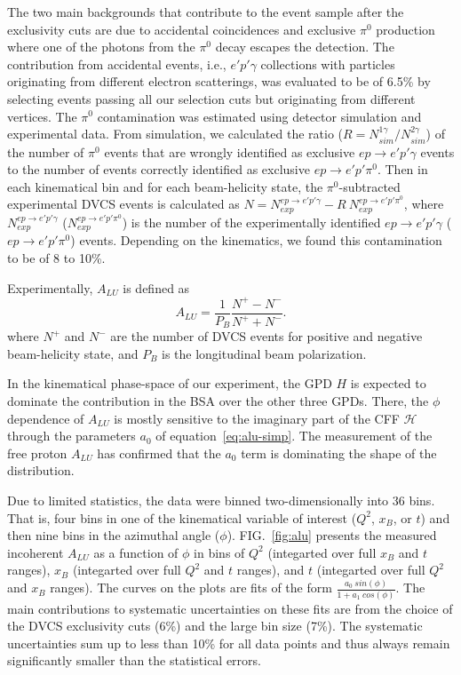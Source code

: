 \documentclass[twocolumn,nofootinbib,showpacs,prl,superscriptaddress,secnumarabic,amssymb,nobibnotes,aps,floatfix]{revtex4}
\begin{document}
The two main backgrounds that contribute to the event sample after the exclusivity cuts are  
due to accidental coincidences and exclusive $\pi^0$ production where one of the photons 
from the $\pi^0$ decay escapes the detection. The contribution from accidental 
events, i.e., $e'p'\gamma$ collections 
with particles originating from different electron scatterings,
was evaluated to be of 6.5\% by selecting events passing all our selection cuts but originating from 
different vertices. The $\pi^0$ contamination was estimated using detector 
simulation and experimental data. From simulation, we calculated the ratio ($R 
= N^{1\gamma}_{sim}/N^{2\gamma}_{sim}$) of the number of $\pi^0$ events that 
are wrongly identified as exclusive $ep\rightarrow e'p'\gamma$ events to the 
number of events correctly identified as exclusive $ep\rightarrow e'p'\pi^0$.  
Then in each kinematical bin and for each beam-helicity state, the 
$\pi^0$-subtracted experimental DVCS events is calculated as $N = 
N^{ep\rightarrow e'p'\gamma}_{exp}- R~N^{ep\rightarrow e'p'\pi^0}_{exp}$, where 
$N^{ep\rightarrow e'p'\gamma}_{exp}$ ($N^{ep\rightarrow e'p'\pi^0}_{exp}$) is 
the number of the experimentally identified $ep\rightarrow e'p'\gamma$ 
($ep\rightarrow e'p'\pi^0$) events. Depending on the kinematics, we found this 
contamination to be of 8 to 10\%. 


Experimentally, $A_{LU}$ is defined as
\begin{equation}
A_{LU} = \frac{1}{P_{B}} \frac{N^{+} - N^{-}}{N^{+} + N^{-} }.
\end{equation}
where $N^{+}$ and $N^{-}$ are the number of DVCS events for positive and negative 
beam-helicity state, and $P_{B}$ is the longitudinal beam polarization.  

In the kinematical phase-space of our experiment, the GPD $H$ is
expected to dominate the 
contribution in the BSA over the other three GPDs. There, 
the $\phi$ dependence of $A_{LU}$ is mostly sensitive to the  
imaginary part of the CFF $\mathcal{H}$ through the parameters $a_0$ of 
equation~\ref{eq:alu-simp}. The measurement of the free proton 
$A_{LU}$ \cite{Girod:2007aa} has confirmed that the $a_0$ term is 
dominating the shape of the distribution. 

Due to limited statistics, the data were binned two-dimensionally into 36 bins.  
That is, four bins in one of the kinematical variable of interest ($Q^{2}$, 
$x_{B}$, or $t$) and then nine bins in the azimuthal angle ($\phi$).   
FIG.~\ref{fig:alu} presents the measured incoherent $A_{LU}$ as a function of 
$\phi$ in bins of $Q^{2}$ (integarted over full $x_{B}$ and $t$ ranges), 
$x_{B}$ (integarted over full $Q^{2}$ and $t$ ranges), and $t$ (integarted over 
full $Q^{2}$ and $x_{B}$ ranges). The curves on the plots are fits of the form 
$\frac{a_{0}~sin(\phi)}{1+ a_{1}~cos(\phi)}$.  The main contributions to 
systematic uncertainties on these fits are from the choice of the DVCS 
exclusivity cuts (6\%) and the large bin size (7\%). The systematic 
uncertainties sum up to less than 10\% for all data points and thus always 
remain significantly smaller than the statistical errors.
\end{document}

